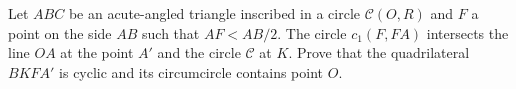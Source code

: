 Let $ABC$ be an acute-angled triangle inscribed in a circle $\mathcal C (O, R)$ and $F$ a point on the side $AB$ such that $AF < AB/2$. The circle $c_1(F, FA)$ intersects the line $OA$ at the point $A'$ and the circle $\mathcal C$ at $K$. Prove that the quadrilateral $BKFA'$ is cyclic and its circumcircle contains point $O$.
